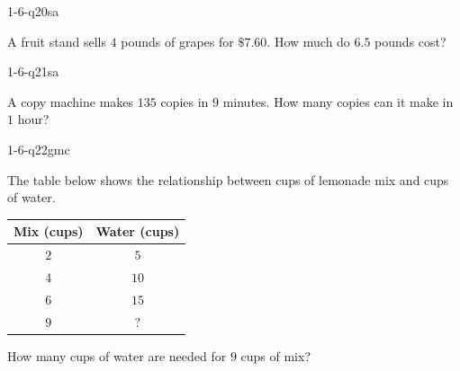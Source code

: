 \begin{practiceQuestion}{1-6-q20}{sa}
\begin{questionText}
A fruit stand sells $4$ pounds of grapes for $\$7.60$. How much do $6.5$ pounds cost?
\end{questionText}
\end{practiceQuestion}

\begin{practiceQuestion}{1-6-q21}{sa}
\begin{questionText}
A copy machine makes $135$ copies in $9$ minutes. How many copies can it make in $1$ hour?
\end{questionText}
\end{practiceQuestion}


\begin{practiceQuestion}{1-6-q22}{gmc}
\begin{questionText}
The table below shows the relationship between cups of lemonade mix and cups of water.

\begin{center}
\begin{tabular}{|c|c|}
\hline
\textbf{Mix (cups)} & \textbf{Water (cups)} \\
\hline
$2$ & $5$ \\
$4$ & $10$ \\
$6$ & $15$ \\
$9$ & $?$ \\
\hline
\end{tabular}
\end{center}

How many cups of water are needed for $9$ cups of mix?
\end{questionText}
\end{practiceQuestion}

